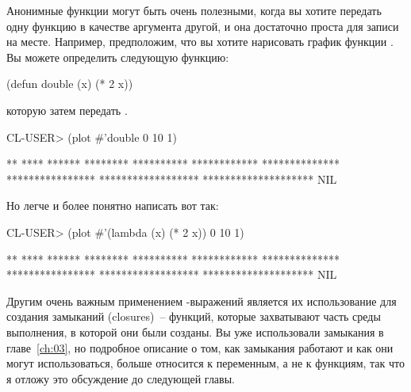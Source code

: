 Анонимные функции могут быть очень полезными, когда вы хотите передать одну функцию в
качестве аргумента другой, и она достаточно проста для записи на месте.  Например,
предположим, что вы хотите нарисовать график функции . Вы можете определить
следующую функцию:

\begin{myverb}
  (defun double (x) (* 2 x))
\end{myverb}

\noindent{}которую затем передать .

\begin{myverb}
  CL-USER> (plot #'double 0 10 1)
  
  **
  ****
  ******
  ********
  **********
  ************
  **************
  ****************
  ******************
  ********************
  NIL
\end{myverb}

Но легче и более понятно написать вот так:

\begin{myverb}
  CL-USER> (plot #'(lambda (x) (* 2 x)) 0 10 1)
  
  **
  ****
  ******
  ********
  **********
  ************
  **************
  ****************
  ******************
  ********************
  NIL
\end{myverb}

Другим очень важным применением -выражений является их использование для
создания замыканий (closures)~-- функций, которые захватывают часть среды выполнения, в
которой они были созданы.  Вы уже использовали замыкания в главе~\ref{ch:03}, но подробное
описание о том, как замыкания работают и как они могут использоваться, больше относится к
переменным, а не к функциям, так что я отложу это обсуждение до следующей главы.

